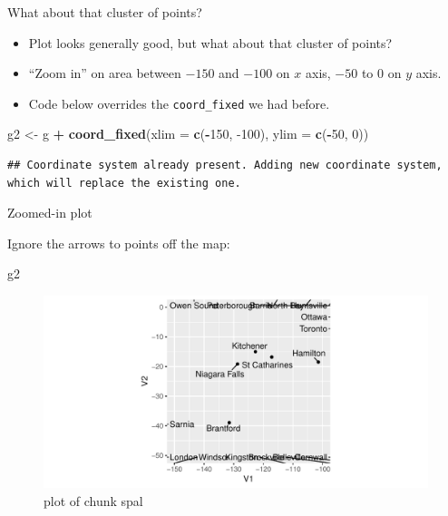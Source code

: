 \documentclass[ignorenonframetext,]{beamer}
\newenvironment{Shaded}{\begin{snugshade}}{\end{snugshade}}
\newcommand{\DataTypeTok}[1]{\textcolor[rgb]{0.13,0.29,0.53}{#1}}
\newcommand{\DecValTok}[1]{\textcolor[rgb]{0.00,0.00,0.81}{#1}}
\newcommand{\KeywordTok}[1]{\textcolor[rgb]{0.13,0.29,0.53}{\textbf{#1}}}
\newcommand{\NormalTok}[1]{#1}
\newcommand{\OperatorTok}[1]{\textcolor[rgb]{0.81,0.36,0.00}{\textbf{#1}}}
\newcommand{\StringTok}[1]{\textcolor[rgb]{0.31,0.60,0.02}{#1}}
\begin{document}
\begin{frame}[fragile]{What about that cluster of points?}
\protect\hypertarget{what-about-that-cluster-of-points}{}

\begin{itemize}
\item
  Plot looks generally good, but what about that cluster of points?
\item
  ``Zoom in'' on area between \(-150\) and \(-100\) on \(x\) axis,
  \(-50\) to 0 on \(y\) axis.
\item
  Code below overrides the \texttt{coord\_fixed} we had before.
\end{itemize}

\begin{Shaded}
\begin{Highlighting}[]
\NormalTok{g2 <-}\StringTok{ }\NormalTok{g }\OperatorTok{+}\StringTok{ }\KeywordTok{coord_fixed}\NormalTok{(}\DataTypeTok{xlim =} \KeywordTok{c}\NormalTok{(}\OperatorTok{-}\DecValTok{150}\NormalTok{, }\DecValTok{-100}\NormalTok{), }\DataTypeTok{ylim =} \KeywordTok{c}\NormalTok{(}\OperatorTok{-}\DecValTok{50}\NormalTok{, }\DecValTok{0}\NormalTok{))}
\end{Highlighting}
\end{Shaded}

\begin{verbatim}
## Coordinate system already present. Adding new coordinate system, which will replace the existing one.
\end{verbatim}

\end{frame}

\begin{frame}[fragile]{Zoomed-in plot}
\protect\hypertarget{zoomed-in-plot}{}

Ignore the arrows to points off the map:

\begin{Shaded}
\begin{Highlighting}[]
\NormalTok{g2}
\end{Highlighting}
\end{Shaded}

\begin{figure}
\centering
\includegraphics{figure/spal-1.pdf}
\caption{plot of chunk spal}
\end{figure}

\end{frame}
\end{document}
